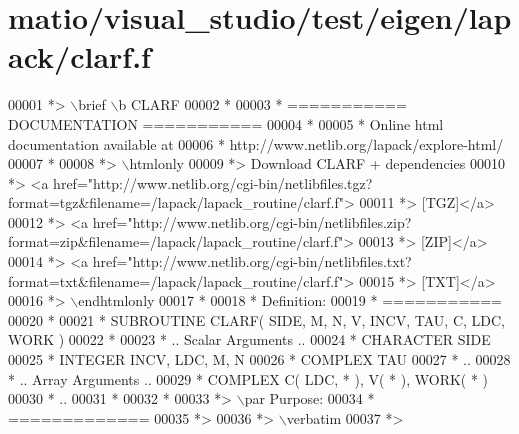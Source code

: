 \hypertarget{matio_2visual__studio_2test_2eigen_2lapack_2clarf_8f_source}{}\section{matio/visual\+\_\+studio/test/eigen/lapack/clarf.f}
\label{matio_2visual__studio_2test_2eigen_2lapack_2clarf_8f_source}

\begin{DoxyCode}
00001 \textcolor{comment}{*> \(\backslash\)brief \(\backslash\)b CLARF}
00002 \textcolor{comment}{*}
00003 \textcolor{comment}{*  =========== DOCUMENTATION ===========}
00004 \textcolor{comment}{*}
00005 \textcolor{comment}{* Online html documentation available at }
00006 \textcolor{comment}{*            http://www.netlib.org/lapack/explore-html/ }
00007 \textcolor{comment}{*}
00008 \textcolor{comment}{*> \(\backslash\)htmlonly}
00009 \textcolor{comment}{*> Download CLARF + dependencies }
00010 \textcolor{comment}{*> <a
       href="http://www.netlib.org/cgi-bin/netlibfiles.tgz?format=tgz&filename=/lapack/lapack\_routine/clarf.f"> }
00011 \textcolor{comment}{*> [TGZ]</a> }
00012 \textcolor{comment}{*> <a
       href="http://www.netlib.org/cgi-bin/netlibfiles.zip?format=zip&filename=/lapack/lapack\_routine/clarf.f"> }
00013 \textcolor{comment}{*> [ZIP]</a> }
00014 \textcolor{comment}{*> <a
       href="http://www.netlib.org/cgi-bin/netlibfiles.txt?format=txt&filename=/lapack/lapack\_routine/clarf.f"> }
00015 \textcolor{comment}{*> [TXT]</a>}
00016 \textcolor{comment}{*> \(\backslash\)endhtmlonly }
00017 \textcolor{comment}{*}
00018 \textcolor{comment}{*  Definition:}
00019 \textcolor{comment}{*  ===========}
00020 \textcolor{comment}{*}
00021 \textcolor{comment}{*       SUBROUTINE CLARF( SIDE, M, N, V, INCV, TAU, C, LDC, WORK )}
00022 \textcolor{comment}{* }
00023 \textcolor{comment}{*       .. Scalar Arguments ..}
00024 \textcolor{comment}{*       CHARACTER          SIDE}
00025 \textcolor{comment}{*       INTEGER            INCV, LDC, M, N}
00026 \textcolor{comment}{*       COMPLEX            TAU}
00027 \textcolor{comment}{*       ..}
00028 \textcolor{comment}{*       .. Array Arguments ..}
00029 \textcolor{comment}{*       COMPLEX            C( LDC, * ), V( * ), WORK( * )}
00030 \textcolor{comment}{*       ..}
00031 \textcolor{comment}{*  }
00032 \textcolor{comment}{*}
00033 \textcolor{comment}{*> \(\backslash\)par Purpose:}
00034 \textcolor{comment}{*  =============}
00035 \textcolor{comment}{*>}
00036 \textcolor{comment}{*> \(\backslash\)verbatim}
00037 \textcolor{comment}{*>}

\end{DoxyCode}
